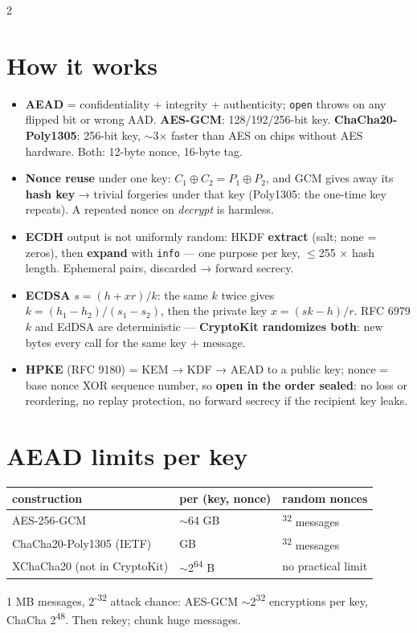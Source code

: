 \documentclass[8pt]{extarticle}
\newcommand\ct[1]{\texttt{#1}}
\begin{document}
\begin{multicols}{2}
\raggedright
\footnotesize{}

\section{How it works}
\begin{itemize}
  \item \textbf{AEAD} = confidentiality + integrity + authenticity; \ct{open} throws on any flipped
        bit or wrong AAD. \textbf{AES-GCM}: 128/192/256-bit key. \textbf{ChaCha20-Poly1305}: 256-bit
        key, $\sim$3$\times$ faster than AES on chips without AES hardware. Both: 12-byte nonce,
        16-byte tag.
  \item \textbf{Nonce reuse} under one key: $C_1 \oplus C_2 = P_1 \oplus P_2$, and GCM gives away
        its \textbf{hash key} → trivial forgeries under that key (Poly1305: the one-time key
        repeats). A repeated nonce on \emph{decrypt} is harmless.
  \item \textbf{ECDH} output is not uniformly random: HKDF \textbf{extract} (salt; none = zeros),
        then \textbf{expand} with \ct{info} — one purpose per key, $\le$255 × hash length.
        Ephemeral pairs, discarded → forward secrecy.
  \item \textbf{ECDSA} $s = (h + x r)/k$: the same $k$ twice gives $k = (h_1 - h_2)/(s_1 - s_2)$,
        then the private key $x = (s k - h)/r$. RFC 6979 $k$ and EdDSA are deterministic —
        \textbf{CryptoKit randomizes both}: new bytes every call for the same key + message.
  \item \textbf{HPKE} (RFC 9180) = KEM → KDF → AEAD to a public key; nonce = base nonce XOR
        sequence number, so \textbf{open in the order sealed}: no loss or reordering, no replay
        protection, no forward secrecy if the recipient key leaks.
\end{itemize}

\section{AEAD limits per key}
{\scriptsize\setlength{\tabcolsep}{2.5pt}
\begin{tabular}{@{}>{\raggedright\arraybackslash}p{30mm}>{\raggedright\arraybackslash}p{20mm}>{\raggedright\arraybackslash}p{24mm}@{}}
\toprule
\textbf{construction} & \textbf{per (key, nonce)} & \textbf{random nonces}\\
\midrule
AES-256-GCM & $\sim$64 GB & 2\textsuperscript{32} messages\\
ChaCha20-Poly1305 (IETF) & 256 GB & 2\textsuperscript{32} messages\\
XChaCha20 (not in CryptoKit) & $\sim$2\textsuperscript{64} B & no practical limit\\
\bottomrule
\end{tabular}}\par
1 MB messages, 2\textsuperscript{-32} attack chance: AES-GCM $\sim$2\textsuperscript{32} encryptions
per key, ChaCha 2\textsuperscript{48}. Then rekey; chunk huge messages.


\end{multicols}
\end{document}

